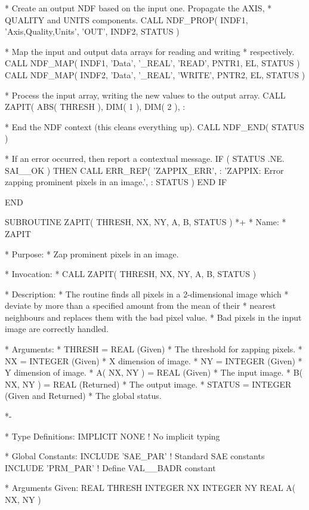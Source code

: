 \documentclass[twoside,11pt,nolof]{starlink}
\begin{document}
\begin{terminalv}
*  Create an output NDF based on the input one. Propagate the AXIS,
*  QUALITY and UNITS components.
      CALL NDF_PROP( INDF1, 'Axis,Quality,Units', 'OUT', INDF2, STATUS )

*  Map the input and output data arrays for reading and writing
*  respectively.
      CALL NDF_MAP( INDF1, 'Data', '_REAL', 'READ', PNTR1, EL, STATUS )
      CALL NDF_MAP( INDF2, 'Data', '_REAL', 'WRITE', PNTR2, EL, STATUS )

*  Process the input array, writing the new values to the output array.
      CALL ZAPIT( ABS( THRESH ), DIM( 1 ), DIM( 2 ), %
     :            %

*  End the NDF context (this cleans everything up).
      CALL NDF_END( STATUS )

*  If an error occurred, then report a contextual message.
      IF ( STATUS .NE. SAI__OK ) THEN
         CALL ERR_REP( 'ZAPPIX_ERR',
     :   'ZAPPIX: Error zapping prominent pixels in an image.',
     :   STATUS )
      END IF

      END

      SUBROUTINE ZAPIT( THRESH, NX, NY, A, B, STATUS )
*+
*  Name:
*     ZAPIT

*  Purpose:
*     Zap prominent pixels in an image.

*  Invocation:
*     CALL ZAPIT( THRESH, NX, NY, A, B, STATUS )

*  Description:
*     The routine finds all pixels in a 2-dimensional image which
*     deviate by more than a specified amount from the mean of their
*     nearest neighbours and replaces them with the bad pixel value.
*     Bad pixels in the input image are correctly handled.

*  Arguments:
*     THRESH = REAL (Given)
*        The threshold for zapping pixels.
*     NX = INTEGER (Given)
*        X dimension of image.
*     NY = INTEGER (Given)
*        Y dimension of image.
*     A( NX, NY ) = REAL (Given)
*        The input image.
*     B( NX, NY ) = REAL (Returned)
*        The output image.
*     STATUS = INTEGER (Given and Returned)
*        The global status.

*-

*  Type Definitions:
      IMPLICIT NONE              ! No implicit typing

*  Global Constants:
      INCLUDE 'SAE_PAR'          ! Standard SAE constants
      INCLUDE 'PRM_PAR'          ! Define VAL__BADR constant

*  Arguments Given:
      REAL THRESH
      INTEGER NX
      INTEGER NY
      REAL A( NX, NY )


\end{terminalv}
\end{document}
